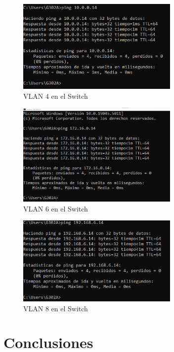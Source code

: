         \begin{figure}[H]
            \centering
            \includegraphics[width=0.7\textwidth]{img/ping_vlan4.png}
            \caption{VLAN 4 en el Switch}
            \label{fig:ping_vlan4}
        \end{figure}


        \begin{figure}[H]
            \centering
            \includegraphics[width=0.7\textwidth]{img/ping_vlan6.png}
            \caption{VLAN 6 en el Switch}
            \label{fig:ping_vlan6}
        \end{figure}

        \begin{figure}[H]
            \centering
            \includegraphics[width=0.7\textwidth]{img/ping_vlan8.png}
            \caption{VLAN 8 en el Switch}
            \label{fig:ping_vlan8}
        \end{figure}


\section{Conclusiones}

